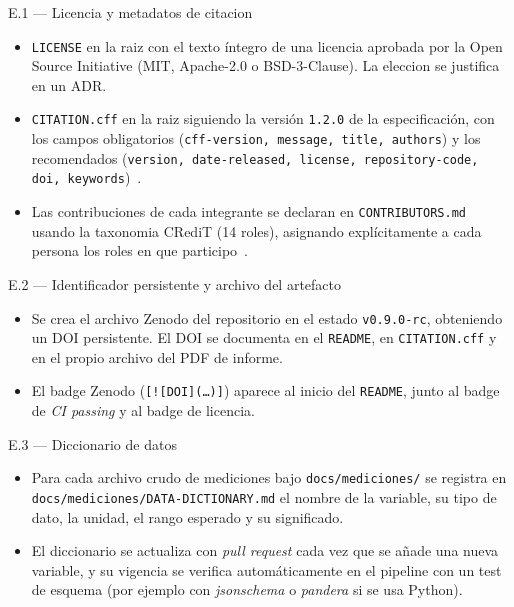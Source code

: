 \documentclass[11pt,a4paper]{article}
\begin{document}
\begin{cajaentregable}{E.1 --- Licencia y metadatos de citacion}
    \begin{itemize}
        \item \texttt{LICENSE} en la raiz con el texto \'{i}ntegro de una licencia aprobada por la Open Source Initiative (MIT, Apache-2.0 o BSD-3-Clause). La eleccion se justifica en un ADR.
        \item \texttt{CITATION.cff} en la raiz siguiendo la versi\'{o}n \texttt{1.2.0} de la especificaci\'{o}n, con los campos obligatorios (\texttt{cff-version, message, title, authors}) y los recomendados (\texttt{version, date-released, license, repository-code, doi, keywords})~\cite{druskat2021cff,smith2016software}.
        \item Las contribuciones de cada integrante se declaran en \texttt{CONTRIBUTORS.md} usando la taxonomia CRediT (14 roles), asignando expl\'{i}citamente a cada persona los roles en que participo~\cite{niso2022credit}.
    \end{itemize}
\end{cajaentregable}

\begin{cajaentregable}{E.2 --- Identificador persistente y archivo del artefacto}
    \begin{itemize}
        \item Se crea el archivo Zenodo del repositorio en el estado \texttt{v0.9.0-rc}, obteniendo un DOI persistente. El DOI se documenta en el \texttt{README}, en \texttt{CITATION.cff} y en el propio archivo del PDF de informe.
        \item El badge Zenodo (\texttt{[![DOI](\ldots)]}) aparece al inicio del \texttt{README}, junto al badge de \emph{CI passing} y al badge de licencia.
    \end{itemize}
\end{cajaentregable}

\begin{cajaentregable}{E.3 --- Diccionario de datos}
    \begin{itemize}
        \item Para cada archivo crudo de mediciones bajo \texttt{docs/mediciones/} se registra en \texttt{docs/mediciones/DATA-DICTIONARY.md} el nombre de la variable, su tipo de dato, la unidad, el rango esperado y su significado.
        \item El diccionario se actualiza con \emph{pull request} cada vez que se a\~{n}ade una nueva variable, y su vigencia se verifica autom\'{a}ticamente en el pipeline con un test de esquema (por ejemplo con \emph{jsonschema} o \emph{pandera} si se usa Python).
    \end{itemize}
\end{cajaentregable}
\end{document}
